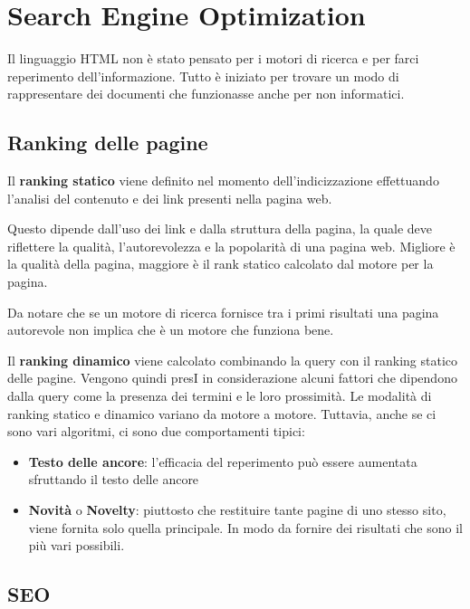 
\section{Search Engine Optimization}

Il linguaggio HTML non è stato pensato per i motori di ricerca e per farci reperimento dell'informazione. Tutto è iniziato per trovare un modo di rappresentare dei documenti che funzionasse anche per non informatici.

\subsection{Ranking delle pagine}

Il \textbf{ranking statico} viene definito nel momento dell'indicizzazione effettuando l'analisi del contenuto e dei link presenti nella pagina web.

Questo dipende dall'uso dei link e dalla struttura della pagina, la quale deve riflettere la qualità, l'autorevolezza e la popolarità di una pagina web. 
Migliore è la qualità della pagina, maggiore è il rank statico calcolato dal motore per la pagina.

Da notare che se un motore di ricerca fornisce tra i primi risultati una pagina autorevole non implica che è un motore che funziona bene.

Il \textbf{ranking dinamico} viene calcolato combinando la query con il ranking statico delle pagine. Vengono quindi presI in considerazione alcuni fattori che dipendono dalla query come la presenza dei termini e le loro prossimità.
Le modalità di ranking statico e dinamico variano da motore a motore.
Tuttavia, anche se ci sono vari algoritmi, ci sono due comportamenti tipici:

\begin{itemize}
	\item \textbf{Testo delle ancore}: l’efficacia del reperimento può essere aumentata sfruttando il testo delle ancore
	\item \textbf{Novità} o \textbf{Novelty}: piuttosto che restituire tante pagine di uno stesso sito, viene fornita solo quella principale. In modo da fornire dei risultati che sono il più vari possibili.
\end{itemize}

\subsection{SEO}

